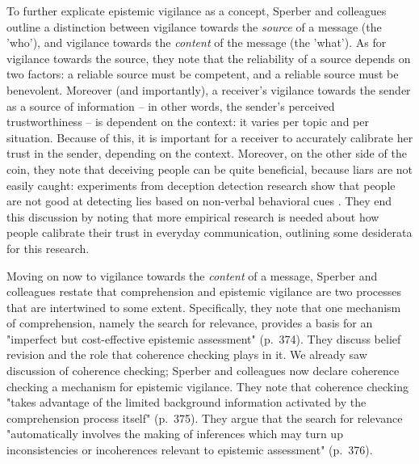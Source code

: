 To further explicate epistemic vigilance as a concept, Sperber and colleagues outline a distinction between vigilance towards the \emph{source} of a message (the 'who'), and vigilance towards the \emph{content} of the message (the 'what').
As for vigilance towards the source, they note that the reliability of a source depends on two factors: a reliable source must be competent, and a reliable source must be benevolent.
Moreover (and importantly), a receiver's vigilance towards the sender as a source of information -- in other words, the sender's perceived trustworthiness -- is dependent on the context: it varies per topic and per situation.
Because of this, it is important for a receiver to accurately calibrate her trust in the sender, depending on the context.
Moreover, on the other side of the coin, they note that deceiving people can be quite beneficial, because liars are not easily caught: experiments from deception detection research show that people are not good at detecting lies based on non-verbal behavioral cues \citep[see e.g.][]{Vrij00}.
They end this discussion by noting that more empirical research is needed about how people calibrate their trust in everyday communication, outlining some desiderata for this research.


Moving on now to vigilance towards the \emph{content} of a message, Sperber and colleagues restate that comprehension and epistemic vigilance are two processes that are intertwined to some extent. Specifically, they note that one mechanism of comprehension, namely the search for relevance, provides a basis for an "imperfect but cost-effective epistemic assessment" (p.~374).
They discuss belief revision and the role that coherence checking plays in it. We already saw  discussion of coherence checking; Sperber and colleagues now declare coherence checking a mechanism for epistemic vigilance. They note that coherence checking "takes advantage of the limited background information activated by the comprehension process itself" (p.~375). They argue that the search for relevance "automatically involves the making of inferences which may turn up inconsistencies or incoherences relevant to epistemic assessment" (p.~376).


